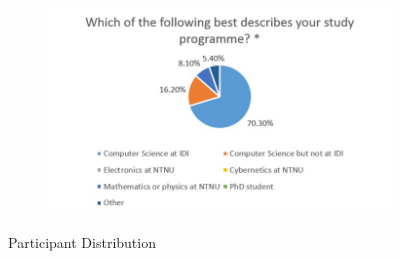 \begin{figure}
\begin{subfigure}[h]{0.4\textwidth}
        \includegraphics[width=1.5\textwidth, height=1.0\textwidth]{oldresults/distribution.jpg}
        \caption{}
        \label{fig:participants}
    \end{subfigure}
    \caption[]{Participant Distribution}
    \label{fig:oldsurvey-dist}
\end{figure}
